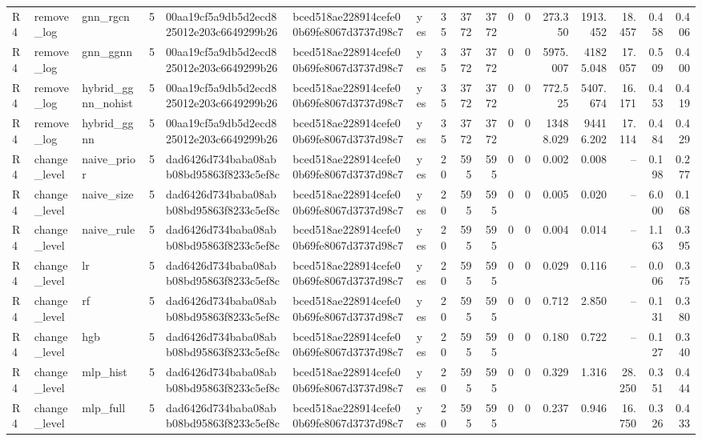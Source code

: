 \begin{table}[htbp]
{\begin{tabular}{lllrlllrrrrrrrrrr}
R4 & remove\_log & gnn\_rgcn & 5 & 00aa19cf5a9db5d2ecd825012e203c6649299b26 & bced518ae228914cefe00b69fe8067d3737d98c7 & yes & 35 & 3772 & 3772 & 0 & 0 & 273.350 & 1913.452 & 18.457 & 0.458 & 0.406 \\
R4 & remove\_log & gnn\_ggnn & 5 & 00aa19cf5a9db5d2ecd825012e203c6649299b26 & bced518ae228914cefe00b69fe8067d3737d98c7 & yes & 35 & 3772 & 3772 & 0 & 0 & 5975.007 & 41825.048 & 17.057 & 0.509 & 0.400 \\
R4 & remove\_log & hybrid\_ggnn\_nohist & 5 & 00aa19cf5a9db5d2ecd825012e203c6649299b26 & bced518ae228914cefe00b69fe8067d3737d98c7 & yes & 35 & 3772 & 3772 & 0 & 0 & 772.525 & 5407.674 & 16.171 & 0.453 & 0.419 \\
R4 & remove\_log & hybrid\_ggnn & 5 & 00aa19cf5a9db5d2ecd825012e203c6649299b26 & bced518ae228914cefe00b69fe8067d3737d98c7 & yes & 35 & 3772 & 3772 & 0 & 0 & 13488.029 & 94416.202 & 17.114 & 0.484 & 0.429 \\
R4 & change\_level & naive\_prior & 5 & dad6426d734baba08abb08bd95863f8233c5ef8c & bced518ae228914cefe00b69fe8067d3737d98c7 & yes & 20 & 595 & 595 & 0 & 0 & 0.002 & 0.008 & -- & 0.198 & 0.277 \\
R4 & change\_level & naive\_size & 5 & dad6426d734baba08abb08bd95863f8233c5ef8c & bced518ae228914cefe00b69fe8067d3737d98c7 & yes & 20 & 595 & 595 & 0 & 0 & 0.005 & 0.020 & -- & 6.000 & 0.168 \\
R4 & change\_level & naive\_rule & 5 & dad6426d734baba08abb08bd95863f8233c5ef8c & bced518ae228914cefe00b69fe8067d3737d98c7 & yes & 20 & 595 & 595 & 0 & 0 & 0.004 & 0.014 & -- & 1.163 & 0.395 \\
R4 & change\_level & lr & 5 & dad6426d734baba08abb08bd95863f8233c5ef8c & bced518ae228914cefe00b69fe8067d3737d98c7 & yes & 20 & 595 & 595 & 0 & 0 & 0.029 & 0.116 & -- & 0.006 & 0.375 \\
R4 & change\_level & rf & 5 & dad6426d734baba08abb08bd95863f8233c5ef8c & bced518ae228914cefe00b69fe8067d3737d98c7 & yes & 20 & 595 & 595 & 0 & 0 & 0.712 & 2.850 & -- & 0.131 & 0.380 \\
R4 & change\_level & hgb & 5 & dad6426d734baba08abb08bd95863f8233c5ef8c & bced518ae228914cefe00b69fe8067d3737d98c7 & yes & 20 & 595 & 595 & 0 & 0 & 0.180 & 0.722 & -- & 0.127 & 0.340 \\
R4 & change\_level & mlp\_hist & 5 & dad6426d734baba08abb08bd95863f8233c5ef8c & bced518ae228914cefe00b69fe8067d3737d98c7 & yes & 20 & 595 & 595 & 0 & 0 & 0.329 & 1.316 & 28.250 & 0.351 & 0.444 \\
R4 & change\_level & mlp\_full & 5 & dad6426d734baba08abb08bd95863f8233c5ef8c & bced518ae228914cefe00b69fe8067d3737d98c7 & yes & 20 & 595 & 595 & 0 & 0 & 0.237 & 0.946 & 16.750 & 0.326 & 0.433 \\

\end{tabular}}
\end{table}
